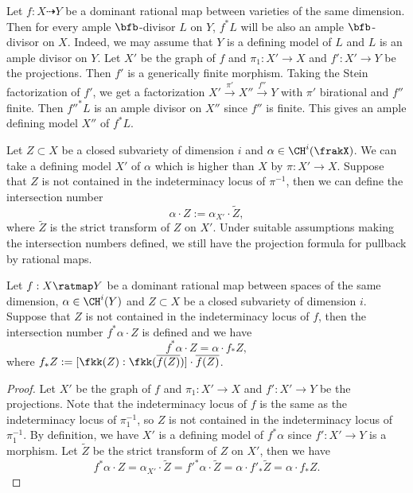   Let $f: X \dashrightarrow Y$ be a dominant rational map between varieties of the same dimension.
  Then for every ample $\bfb$-divisor $L$ on $Y$, $f^* L$ will be also an ample $\bfb$-divisor on $X$.
  Indeed, we may assume that $Y$ is a defining model of $L$ and $L$ is an ample divisor on $Y$.
  Let $X'$ be the graph of $f$ and $\pi_1: X' \to X$ and $f': X' \to Y$ be the projections.
  Then $f'$ is a generically finite morphism.
  Taking the Stein factorization of $f'$, we get a factorization $X' \xrightarrow{\pi'} X'' \xrightarrow{f''} Y$ with $\pi'$ birational and $f''$ finite.
  Then $f''^* L$ is an ample divisor on $X''$ since $f''$ is finite.
  This gives an ample defining model $X''$ of $f^* L$.

  Let $Z \subset X$ be a closed subvariety of dimension $i$ and $\alpha \in \CH^i(\frakX)$.
  We can take a defining model $X'$ of $\alpha$ which is higher than $X$ by $\pi: X' \to X$.
  Suppose that $Z$ is not contained in the indeterminacy locus of $\pi^{-1}$, then we can define the intersection number 
  \[ \alpha \cdot Z := \alpha_{X'} \cdot \tilde{Z}, \]
  where $\tilde{Z}$ is the strict transform of $Z$ on $X'$.
  Under suitable assumptions making the intersection numbers defined, we still have the projection formula for pullback by rational maps.

  \begin{proposition}\label{prop:projection_formula_for_pullback_by_rational_maps}
    Let $f: X \ratmap Y$ be a dominant rational map between spaces of the same dimension, $\alpha \in \CH^i(Y)$ and $Z \subset X$ be a closed subvariety of dimension $i$.
    Suppose that $Z$ is not contained in the indeterminacy locus of $f$, then the intersection number $f^* \alpha \cdot Z$ is defined and we have
    \[ f^* \alpha \cdot Z = \alpha \cdot f_*Z, \]
    where $f_*Z := [\fkk(Z) : \fkk(\overline{f(Z)})] \cdot \overline{f(Z)}$.
  \end{proposition}
  \begin{proof}
    Let $X'$ be the graph of $f$ and $\pi_1: X' \to X$ and $f': X' \to Y$ be the projections.
    Note that the indeterminacy locus of $f$ is the same as the indeterminacy locus of $\pi_1^{-1}$, so $Z$ is not contained in the indeterminacy locus of $\pi_1^{-1}$.
    By definition, we have $X'$ is a defining model of $f^* \alpha$ since $f': X' \to Y$ is a morphism.
    Let $\tilde{Z}$ be the strict transform of $Z$ on $X'$, then we have
    \[ f^* \alpha \cdot Z = \alpha_{X'} \cdot \tilde{Z} = f'^* \alpha \cdot \tilde{Z} = \alpha \cdot f'_* \tilde{Z} = \alpha \cdot f_*Z. \]
  \end{proof}


